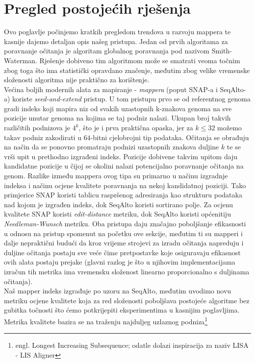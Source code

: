 \documentclass[times, utf8, diplomski]{fer}
\begin{document}
\section{Pregled postojećih rješenja}
Ovo poglavlje počinjemo kratkih pregledom trendova u razvoju mappera te kasnije dajemo detaljan opis našeg pristupa. Jedan od prvih algoritama za poravnanje očitanja je algoritam globalnog poravnanja pod nazivom Smith-Waterman\cite{Smith1981195}. Rješenje dobiveno tim algoritmom može se smatrati veoma točnim zbog toga što ima statistički opravdano značenje, međutim zbog velike vremenske složenosti algoritma nije praktično za korištenje.\\
Većina boljih modernih alata za mapiranje - \emph{mappera} (poput SNAP-a\cite{SNAP} i SeqAlto-a\cite{seqalto}) koriste \emph{seed-and-extend} pristup. U tom pristupu prvo se od 
referentnog genoma gradi indeks koji mapira niz od svakih uzastopnih k-znakova genoma na sve pozicije unutar genoma na kojima se taj podniz nalazi. Ukupan broj takvih različitih podnizova je $4^k$, što je i prva praktična opaska, jer za $k\le32$ možemo takav podniz zakodirati u $64$-bitni cjelobrojni tip podataka. Očitanja se obrađuju na način da se ponovno promatraju podnizi uzastopnih znakova duljine $k$ te se vrši upit u prethodno izgrađeni indeks. Pozicije dobivene takvim upitom daju kandidatne pozicije u čijoj se okolini nalazi potencijalno poravnanje očitanja na genom. Razlike između mappera ovog tipa su primarno u načinu izgradnje indeksa i načinu ocjene kvalitete poravnanja na nekoj kandidatnoj poziciji. Tako primjerice SNAP koristi tablicu raspršenog adresiranja kao strukturu podataka nad kojom je izgrađen indeks, dok SeqAlto koristi sortirano polje. Za ocjenu kvalitete SNAP koristi \emph{edit-distance} metriku, dok SeqAlto koristi općenitiju \emph{Needleman-Wunsch}\cite{nw} metriku. Oba pristupa daju značajno poboljšanje efikasnosti u odnosu na pristup spomenut na početku ove sekcije, međutim ti su mapperi i dalje nepraktični budući da kroz vrijeme strojevi za izradu očitanja napreduju i duljine očitanja postaju sve veće čime pretpostavke koje osiguravaju efikasnost ovih alata postaju prejake (glavni razlog je što u njihovim implementacijama izračun tih metrika ima vremensku složenost linearno proporcionalno s duljinama očitanja).\\
Naš mapper indeks izgrađuje po uzoru na SeqAlto, međutim uvodimo novu metriku ocjene kvalitete koja za red složenosti poboljšava postojeće algoritme bez gubitka točnosti što ćemo potkrijepiti eksperimentima u kasnijim poglavljima.
Metrika kvalitete bazira se na traženju najduljeg uzlaznog podniza\footnote{engl. Longest Increasing Subsequence; odatle dolazi inspiracija za naziv LISA - LIS Aligner}\\
\end{document}
